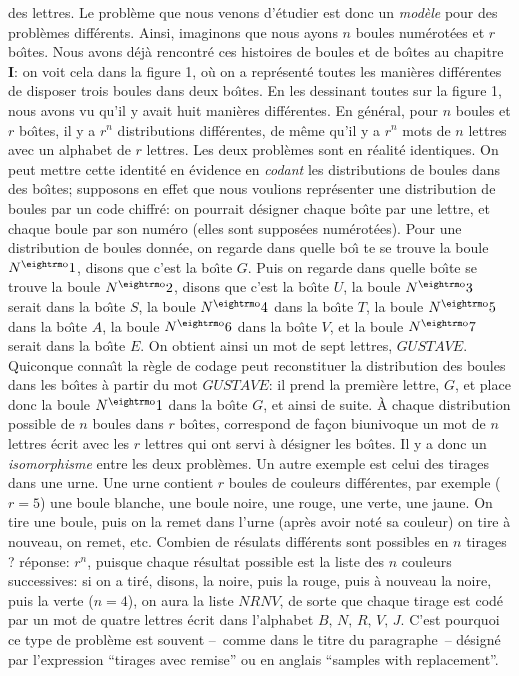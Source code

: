 des lettres. Le probl\`eme que nous venons d'\'etudier est donc un {\it 
mod\`ele} pour des probl\`emes diff\'erents. 
\medskip 
Ainsi, imaginons que nous ayons  $n$ boules num\'erot\'ees et $r$ 
bo\^\i tes. Nous avons d\'ej\`a rencontr\'e ces histoires de boules et de 
bo\^\i tes au chapitre {\bf I}: on voit cela dans la figure 1, o\`u on a 
repr\'esent\'e toutes les mani\`eres diff\'erentes de disposer trois 
boules dans deux bo\^\i tes. En les dessinant toutes sur la figure 1, 
nous avons vu qu'il y avait huit mani\`eres diff\'erentes. En g\'en\'eral,  
pour  $n$ boules et $r$ bo\^\i tes, il y a $r^n$ distributions 
diff\'erentes,  de m\^eme qu'il y a $r^n$ mots de $n$ lettres avec un 
alphabet de $r$ lettres. Les deux probl\`emes sont en r\'ealit\'e 
identiques.  
\medskip 
On peut mettre cette identit\'e en \'evidence en {\it codant} 
les distributions de  boules dans des bo\^\i tes; supposons en effet que 
nous voulions repr\'esenter une distribution de boules par un code 
chiffr\'e: on pourrait d\'esigner chaque bo\^\i te par une lettre, et 
chaque boule par son num\'ero (elles sont suppos\'ees num\'erot\'ees). 
Pour une distribution de boules donn\'ee,  on regarde dans quelle bo\^\i 
te se trouve la boule $N^{\rm o}1$, disons que c'est la bo\^\i te $G$.  
Puis on regarde dans quelle bo\^\i te se trouve la boule $N^{\rm o}2$, 
disons que c'est la  bo\^\i te $U$, la boule $N^{\rm o}3$ serait dans la  
bo\^\i te $S$, la  boule $N^{\rm o}4$ dans la bo\^\i te $T$, la boule 
$N^{\rm o}5$ dans la bo\^\i te $A$, la boule $N^{\rm o}6$ dans  
la bo\^\i te $V$, et la boule $N^{\rm o}7$ serait dans la bo\^\i te 
$E$. On obtient ainsi un mot de sept lettres, $GU\! ST\! AV\! E$. 
Quiconque conna\^\i t la r\`egle de codage peut reconstituer la 
distribution des boules dans les bo\^\i tes \`a partir du mot  
$GU\! ST\! AV\! E$: il prend la premi\`ere lettre, $G$, et place donc la 
boule $N^{\rm o}1$ dans la   bo\^\i te $G$, et ainsi de suite. \`A chaque 
distribution possible de $n$ boules dans $r$ bo\^\i tes, correspond de 
fa\c con biunivoque un mot de $n$ lettres \'ecrit avec les $r$ lettres 
qui ont servi \`a d\'esigner les bo\^\i tes. Il y a donc un {\it 
isomorphisme} entre les deux probl\`emes.  
\medskip 
Un autre exemple est celui des tirages dans une urne. Une urne contient  
$r$ boules de couleurs diff\'erentes, par exemple ($r=5$) une boule 
blanche, une boule noire, une rouge, une verte, une jaune. On tire  une 
boule, puis on la remet dans l'urne (apr\`es avoir not\'e sa couleur) on  
tire \`a nouveau, on remet, etc. Combien de r\'esulats diff\'erents 
sont possibles en $n$ tirages ? r\'eponse: $r^n$, puisque chaque  
r\'esultat possible est la liste des $n$ couleurs successives: si on a 
tir\'e, disons, la noire, puis la rouge, puis \`a nouveau la noire, puis la 
verte ($n=4$),  on aura la liste $N\! RNV$, de sorte que chaque tirage est 
cod\'e par un mot de quatre lettres \'ecrit dans l'alphabet $B,\, N,\, R,\, 
V,\, J$. C'est pourquoi ce type de probl\`eme est souvent --~comme  
dans le titre du paragraphe~--\hskip6pt d\'esign\'e par l'expression 
``tirages  avec remise'' ou en anglais ``samples with replacement''. 
 
